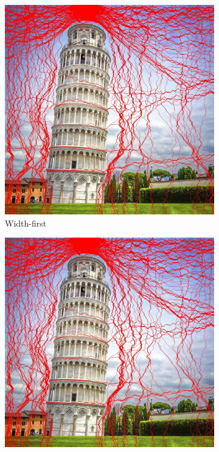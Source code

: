 \documentclass[final]{cvpr}
\begin{document}
\begin{figure}[htb]
\begin{center}
\begin{subfigure}[b]{0.30\linewidth}
    \includegraphics[width=\textwidth]{pisa_seam_carving_width_first_records.jpg}
    \caption{Width-first}
\end{subfigure}
\begin{subfigure}[b]{0.30\linewidth}
    \includegraphics[width=\textwidth]{pisa_seam_carving_height_first_records.jpg}

\end{subfigure}
\end{center}
\end{figure}
\end{document}
